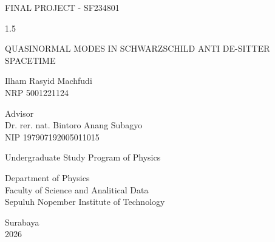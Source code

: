\begin{large}
  FINAL PROJECT - SF234801
\end{large}

\vspace{\fill}

\begin{spacing}{1.5}
  \begin{Large}
    QUASINORMAL MODES IN SCHWARZSCHILD ANTI DE-SITTER SPACETIME
  \end{Large}
\end{spacing}

\vspace{\fill}

\begin{large}
  Ilham Rasyid Machfudi \\
  \textmd{NRP 5001221124}
\end{large}

\vspace{\fill}

\begin{large}
  \textmd{Advisor} \\
  Dr. rer. nat. Bintoro Anang Subagyo \\
  \textmd{NIP 197907192005011015}
\end{large}

\vspace{\fill}

Undergraduate Study Program of Physics \\

\mdseries

Department of Physics \\
Faculty of Science and Analitical Data \\
Sepuluh Nopember Institute of Technology

Surabaya \\
2026

